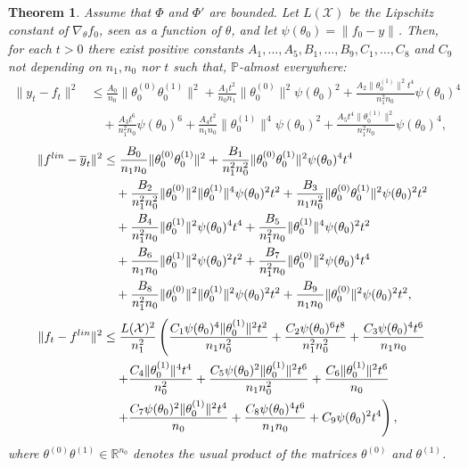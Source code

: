 \documentclass[10pt,a4paper]{amsart}
\newtheorem{thm}{Theorem}
\newcommand{\R}{\mathbb{R}}
\newcommand{\X}{\mathcal{X}}
\newcommand{\lin}{{\textup{lin}}}
\newcommand{\norm}[2]{
    \|#1\|_{#2}
}
\newcommand{\s}{\psi}
\begin{document}
\begin{thm}
    \label{thm:stime_polinomiali}
    Assume that $\Phi$ and $\Phi'$ are bounded.
    Let $L(\X)$ be the Lipschitz constant of $\nabla_\theta f_0$, seen as a function of $\theta$,
    and let $\s(\theta_0) = \norm{f_0-y}{}$.
    Then, for each $t > 0$ there exist positive constants $A_1, \ldots, A_5,B_1, \ldots, B_9,C_1, \ldots, C_8$ and $C_9$ not depending on $n_1, n_0$ nor $t$ such that, $\mathbb P$-almost everywhere:
    \begin{align}
        \norm{y_t- f_t}{}^2 &\le \frac{A_0}{n_0}\norm{\theta^{(0)}_0\theta^{(1)}_0}{}^2 +\frac{A_1t^2}{n_0n_1}\norm{\theta^{(0)}_0}{}^2\s(\theta_0)^2 + \frac{A_2\norm{\theta^{(1)}_0}{}^2t^4}{n_1^2n_0}\s(\theta_0)^4 \\
        &\quad + \frac{A_3t^6}{n_1^2n_0}\s(\theta_0)^6 + \frac{A_4t^2}{n_1n_0}\norm{\theta^{(1)}_0}{}^4\s(\theta_0)^2 + \frac{A_5t^4\norm{\theta^{(1)}_0}{}^2}{n_1^2n_0}\s(\theta_0)^4,
    \end{align}
    \begin{align}
        \norm{f^\lin-\overline y_t}{}^2 &\le \frac{B_0}{n_1n_0}\norm{\theta_0^{(0)}\theta_0^{(1)} }{}^2 + \frac{B_1}{n_1^2n_0^2}\norm{\theta_0^{(0)}\theta_0^{(1)} }{}^2\s(\theta_0)^4t^4\\
        &\quad +\frac{B_2}{n_1^2n_0^2}\norm{\theta_0^{(0)}}{}^2\norm{\theta_0^{(1)} }{}^4\s(\theta_0)^2t^2+\frac{B_3}{n_1n_0^2}\norm{\theta_0^{(0)}\theta_0^{(1)} }{}^2\s(\theta_0)^2 t^2\\
        &\quad +\frac{B_4}{n_1^2n_0}\norm{\theta_0^{(1)} }{}^2\s(\theta_0)^4t^4+\frac{B_5}{n_1^2n_0}\norm{\theta_0^{(1)} }{}^4\s(\theta_0)^2t^2 \\
        &\quad +\frac{B_6}{n_1n_0}\norm{\theta_0^{(1)} }{}^2\s(\theta_0)^2t^2+\frac{B_7}{n_1^2n_0}\norm{\theta_0^{(0)} }{}^2\s(\theta_0)^4t^4 \\
        &\quad +\frac{B_8}{n_1^2n_0}\norm{\theta_0^{(0)} }{}^2\norm{\theta_0^{(1)} }{}^2\s(\theta_0)^2t^2+\frac{B_9}{n_1n_0}\norm{\theta_0^{(0)} }{}^2\s(\theta_0)^2t^2,
    \end{align}
    \begin{align}
        \norm{f_t- f^\lin}{}^2 &\le \frac{L(\X)^2}{n_1^2}\left(\frac{C_1 \s(\theta_0)^4\norm{\theta^{(1)}_0}{}^2t^2}{n_1n_0^2}+\frac{C_2 \s(\theta_0)^6t^8}{n_1^2n_0^2}+\frac{C_3 \s(\theta_0)^4t^6}{n_1n_0}\right. \\
    &\left.\quad +\frac{C_4 \norm{\theta^{(1)}_0}{}^4t^4}{n_0^2}+\frac{C_5 \s(\theta_0)^2\norm{\theta^{(1)}_0}{}^2t^6}{n_1n_0^2}+\frac{C_6 \norm{\theta^{(1)}_0}{}^2t^6}{n_0}\right.\\
    &\left.\quad +\frac{C_7 \s(\theta_0)^2\norm{\theta^{(1)}_0}{}^2t^4}{n_0}+\frac{C_8 \s(\theta_0)^4t^6}{n_1n_0}+C_9\s(\theta_0)^2t^4\right),
\end{align}
where $\theta^{(0)}\theta^{(1)} \in \R^{n_0}$ denotes the usual product of the matrices $\theta^{(0)}$ and $\theta^{(1)}$.
\end{thm}
\end{document}
